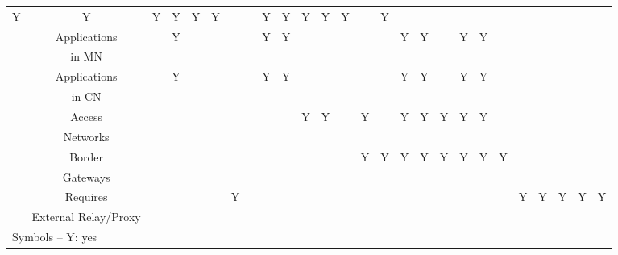 \documentclass[preprint,12pt]{elsarticle}
\begin{document}
\begin{landscape}
\begin{table*}[t]
\begin{tabular}{|c|c|c|c|c|c|c|c|c|c|c|c|c|c|c|c|c|c|c|c|c|c|c|c|c|c|}
              \multirow{2}{*}{Y} &  \multirow{2}{*}{Y} &  \multirow{2}{*}{Y} & 
              \multirow{2}{*}{Y} & \multirow{2}{*}{Y} & \multirow{2}{*}{Y} & & &  \multirow{2}{*}{Y} &
               \multirow{2}{*}{Y} & \multirow{2}{*}{Y} & \multirow{2}{*}{Y} &
                \multirow{2}{*}{Y} & & \multirow{2}{*}{Y} & 
	      & & & \\
  &  in CN & & & & & & & & & & & & & & & & & & & & & & & &\\
  \hhline{~-------------------------}
  &  Applications & &  \multirow{2}{*}{Y} & & & & &
	      \multirow{2}{*}{Y} & \multirow{2}{*}{Y} & & & & & & \multirow{2}{*}{Y} & \multirow{2}{*}{Y} & 
	      &  \multirow{2}{*}{Y} & \multirow{2}{*}{Y} &  & & 
	      & &  & \\
  &  in MN & & & & & & & & & & & & & & & & & & &  & & & & & \\
  \hhline{~-------------------------}
  &  Applications &  & \multirow{2}{*}{Y} & & & & &
	      \multirow{2}{*}{Y} & \multirow{2}{*}{Y} & & &  & & & \multirow{2}{*}{Y} & \multirow{2}{*}{Y} & 
	      &  \multirow{2}{*}{Y} & \multirow{2}{*}{Y} & & 
	       & & & & \\
  &  in CN & & & & & & & & & & & & & & & & & & & & & & & & \\
  \hhline{~-------------------------}
  &  Access & & & &  & & & & & \multirow{2}{*}{Y} & 
              \multirow{2}{*}{Y}  & & \multirow{2}{*}{Y}  & &  \multirow{2}{*}{Y}  & \multirow{2}{*}{Y}  & \multirow{2}{*}{Y}  & \multirow{2}{*}{Y}  & \multirow{2}{*}{Y}  & & & & & &\\
  &  Networks & & & & & & &  & & & & & & & & & & & & & & & & &\\
  \hhline{~-------------------------}
  &  Border   & & & &  & & & & & & & & \multirow{2}{*}{Y} & \multirow{2}{*}{Y} & \multirow{2}{*}{Y} 
              & \multirow{2}{*}{Y} & \multirow{2}{*}{Y} & \multirow{2}{*}{Y} & \multirow{2}{*}{Y}
              & \multirow{2}{*}{Y} & & & & & \\
  &  Gateways & & & & & & & & & & & & & & & & & & & & & & & &\\
  \hhline{~-------------------------}
  &  Requires    & & & & & \multirow{2}{*}{Y} &  & & & & & & & & & & & & & & \multirow{2}{*}{Y} 
	      & \multirow{2}{*}{Y} & 
	      \multirow{2}{*}{Y} & \multirow{2}{*}{Y} & \multirow{2}{*}{Y} \\
  &  External Relay/Proxy & & & & & & & & & & & & & & & & & & & & & & & &\\
\hline
\hline
\multicolumn{26}{|l|}{Symbols -- Y: yes}\\
\hline
\hline
\end{tabular}
\end{table*}
\end{landscape}
\end{document}
